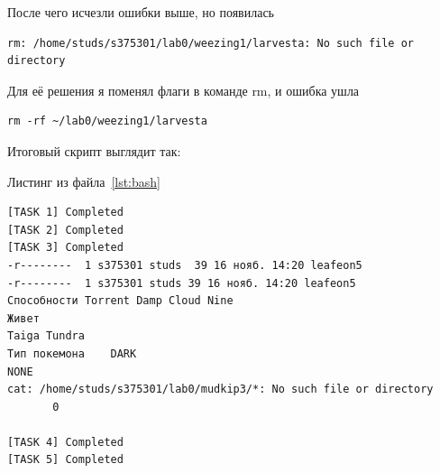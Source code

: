     После чего исчезли ошибки выше, но появилась

    \begin{lstlisting}[caption={Ошибки при выполнении},label={lst:codeedit2}]
            rm: /home/studs/s375301/lab0/weezing1/larvesta: No such file or directory
    \end{lstlisting}

    Для её решения я поменял флаги в команде rm, и ошибка ушла
    \begin{lstlisting}[caption={Добавление force флага},label={lst:codeedit3}]
    rm -rf ~/lab0/weezing1/larvesta
    \end{lstlisting}

    Итоговый скрипт выглядит так:

    Листинг из файла~\ref{lst:bash}
    





    \begin{lstlisting}[caption={Результат выполнения программы},label={lst:result}]
[TASK 1] Completed
[TASK 2] Completed
[TASK 3] Completed
-r--------  1 s375301 studs  39 16 нояб. 14:20 leafeon5
-r--------  1 s375301 studs 39 16 нояб. 14:20 leafeon5
Способности	Torrent Damp Cloud Nine
Живет
Taiga Tundra
Тип покемона	DARK
NONE
cat: /home/studs/s375301/lab0/mudkip3/*: No such file or directory
       0

[TASK 4] Completed
[TASK 5] Completed
    \end{lstlisting}

